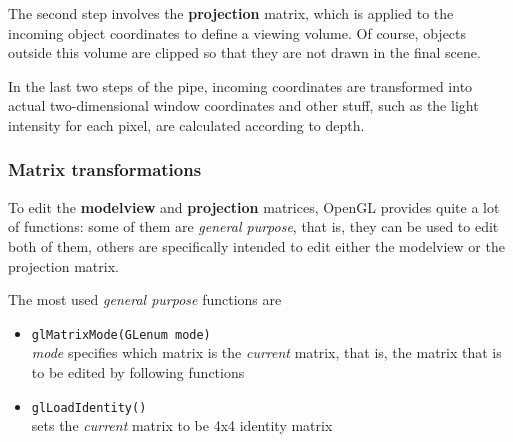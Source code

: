 %
The second step involves the \textbf{projection} matrix, 
which is applied to the incoming object coordinates to define a 
viewing volume. Of course, objects outside this volume are clipped 
so that they are not drawn in the final scene. 
%

%
In the last two steps of the pipe, incoming coordinates are transformed 
into actual two-dimensional window coordinates and other stuff, such as 
the light intensity for each pixel, are calculated according to depth.
%
\subsubsection{Matrix transformations}
To edit the \textbf{modelview} and \textbf{projection} matrices, OpenGL 
provides quite a lot of functions: some of them are 
\textit{general purpose}, that is, they can be used to edit both of them, 
others are specifically intended to edit either the modelview or the 
projection matrix.
%

%
The most used \textit{general purpose} functions are 
%
\begin{itemize}
\item \texttt{glMatrixMode(GLenum mode)} \\
  \textit{mode} specifies which matrix is the \textit{current}
  matrix, that is, the matrix that is to be edited by following
  functions

\item \texttt{glLoadIdentity()} \\
  sets the \textit{current} matrix to be 4x4 identity matrix
\end{itemize}
%

